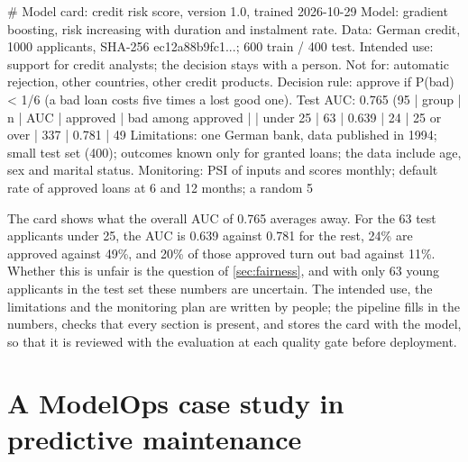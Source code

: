 \begin{pyoutput}
# Model card: credit risk score, version 1.0, trained 2026-10-29
Model: gradient boosting, risk increasing with duration and instalment rate.
Data: German credit, 1000 applicants, SHA-256 ec12a88b9fc1...; 600 train / 400 test.
Intended use: support for credit analysts; the decision stays with a person.
Not for: automatic rejection, other countries, other credit products.
Decision rule: approve if P(bad) < 1/6 (a bad loan costs five times a lost good one).
Test AUC: 0.765 (95%
| group      |   n |   AUC | approved | bad among approved |
| under 25   |  63 | 0.639 | 24%
| 25 or over | 337 | 0.781 | 49%
Limitations: one German bank, data published in 1994; small test set (400);
outcomes known only for granted loans; the data include age, sex and marital status.
Monitoring: PSI of inputs and scores monthly; default rate of approved loans at 6 and
12 months; a random 5%
\end{pyoutput}

The card shows what the overall AUC of 0.765 averages away. For the 63 test applicants under 25,
the AUC is 0.639 against 0.781 for the rest, 24\% are approved against 49\%, and 20\% of those
approved turn out bad against 11\%. Whether this is unfair is the question of \cref{sec:fairness},
and with only 63 young applicants in the test set these numbers are uncertain. The intended use,
the limitations and the monitoring plan are written by people; the pipeline fills in the numbers,
checks that every section is present, and stores the card with the model, so that it is reviewed
with the evaluation at each quality gate before deployment.

\section{A ModelOps case study in predictive maintenance\extsec}\label{sec:mannco}

